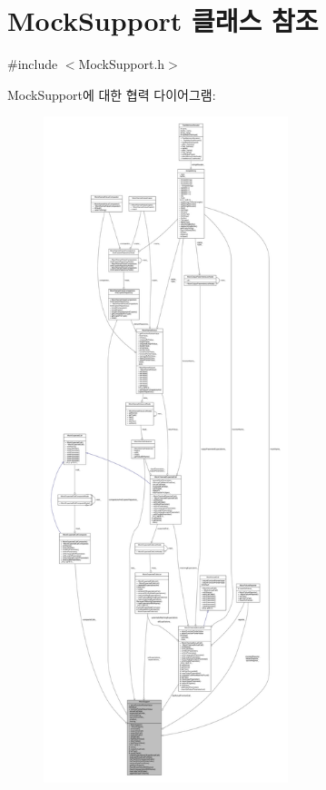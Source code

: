 \hypertarget{class_mock_support}{}\section{Mock\+Support 클래스 참조}
\label{class_mock_support}


{\ttfamily \#include $<$Mock\+Support.\+h$>$}



Mock\+Support에 대한 협력 다이어그램\+:
\nopagebreak
\begin{figure}[H]
\begin{center}
\leavevmode
\includegraphics[height=550pt]{class_mock_support__coll__graph}
\end{center}
\end{figure}
